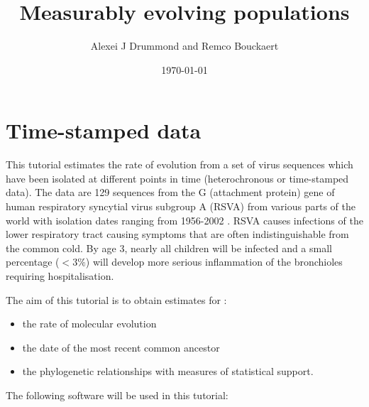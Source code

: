 \documentclass[12pt]{article}
\begin{document}
\author{Alexei J Drummond and Remco Bouckaert}

\date{\today{}}

\title{Measurably evolving populations \label{chap.MEP}}
\maketitle




\section{Time-stamped data}

This tutorial estimates the rate of evolution from a set of virus sequences which have been isolated at different points in time (heterochronous or time-stamped data). The data are 129 sequences from the G (attachment protein) gene of human respiratory
syncytial virus subgroup A (RSVA) from various parts of the world with isolation dates ranging from 1956-2002 \cite{Zlateva:2004uq,Zlateva:2005qy}.
RSVA causes infections of the lower respiratory tract causing symptoms that are often indistinguishable from the common cold. By age 3, nearly all children will be infected and a small percentage ($<3\%$) will develop more serious inflammation of the bronchioles requiring hospitalisation.

The aim of this tutorial is to obtain estimates for :

\begin{itemize}
\item the rate of molecular evolution
\item the date of the most recent common ancestor
\item the phylogenetic relationships with measures of statistical support.
\end{itemize}

The following software will be used in this tutorial:
\end{document}
